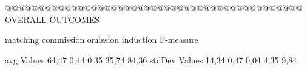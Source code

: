 @@@@@@@@@@@@@@@@@@@@@@@@@@@@@@@@@@@@@@@@@@@@@ OVERALL OUTCOMES

               matching commission   omission  induction  F-measure
               
avg Values      64,47       0,44       0,35      35,74     84,36        
stdDev Values   14,34       0,47       0,04     4,35      9,84        